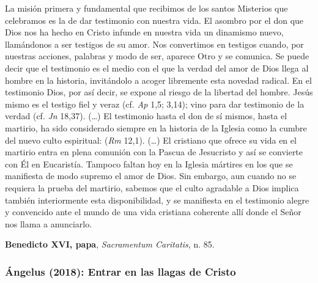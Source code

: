 \begin{patercite}
	La misión primera y fundamental que recibimos de los santos Misterios que celebramos es la de dar testimonio con nuestra vida. El asombro por el don que Dios nos ha hecho en Cristo infunde en nuestra vida un dinamismo nuevo, llamándonos a ser testigos de su amor. Nos convertimos en testigos cuando, por nuestras acciones, palabras y modo de ser, aparece Otro y se comunica. Se puede decir que el testimonio es el medio con el que la verdad del amor de Dios llega al hombre en la historia, invitándolo a acoger libremente esta novedad radical. En el testimonio Dios, por así decir, se expone al riesgo de la libertad del hombre. Jesús mismo es el testigo fiel y veraz (cf. \textit{Ap} 1,5; 3,14); vino para dar testimonio de la verdad (cf. \textit{Jn} 18,37). (\ldots) El testimonio hasta el don de sí mismos, hasta el martirio, ha sido considerado siempre en la historia de la Iglesia como la cumbre del nuevo culto espiritual:  (\textit{Rm} 12,1). (\ldots) El cristiano que ofrece su vida en el martirio entra en plena comunión con la Pascua de Jesucristo y así se convierte con Él en Eucaristía. Tampoco faltan hoy en la Iglesia mártires en los que se manifiesta de modo supremo el amor de Dios. Sin embargo, aun cuando no se requiera la prueba del martirio, sabemos que el culto agradable a Dios implica también interiormente esta disponibilidad, y se manifiesta en el testimonio alegre y convencido ante el mundo de una vida cristiana coherente allí donde el Señor nos llama a anunciarlo.
	
	\textbf{Benedicto XVI, papa}, \textit{Sacramentum Caritatis}, n. 85.
\end{patercite}

\newpage

\subsubsection{Ángelus (2018): Entrar en las llagas de Cristo}


